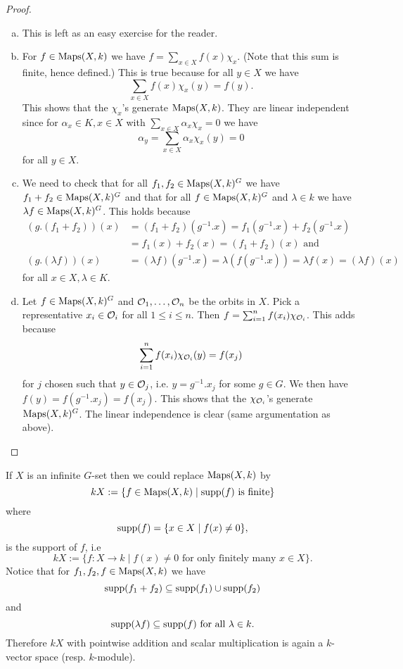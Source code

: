 \begin{proof}
 \begin{enumerate}[a)]
  \item
   This is left as an easy exercise for the reader.
  \item
   For $f \in \operatorname{Maps}(X,k)$ we have $f = \sum_{x \in X} f(x) \chi_x$. (Note that this sum is finite, hence defined.) This is true because for all $y \in X$ we have
   \[
    \sum_{x \in X} f(x) \chi_x(y) = f(y).
   \]
   This shows that the $\chi_x$'s generate $\operatorname{Maps}(X,k)$. They are linear independent since for $\alpha_x \in K, x \in X$ with $\sum_{x \in X} \alpha_x \chi_x = 0$ we have
   \[
    \alpha_y = \sum_{x \in X} \alpha_x \chi_x(y) = 0
   \]
   for all $y \in X$.
  \item
   We need to check that for all $f_1, f_2 \in \operatorname{Maps}(X,k)^G$ we have $f_1+f_2 \in \operatorname{Maps}(X,k)^G$ and that for all $f \in \operatorname{Maps}(X,k)^G$ and $\lambda \in k$ we have $\lambda f \in \operatorname{Maps}(X,k)^G$. This holds because
   \begin{align*}
    (g.(f_1+f_2))(x)
    &= (f_1+f_2)(g^{-1}.x) = f_1(g^{-1}.x) + f_2(g^{-1}.x) \\
    &= f_1(x) + f_2(x) = (f_1+f_2)(x) \text{ and} \\
    (g.(\lambda f))(x)
    &= (\lambda f)(g^{-1}.x) = \lambda (f(g^{-1}.x)) = \lambda f(x) = (\lambda f)(x)
   \end{align*}
   for all $x \in X, \lambda \in K$.
  \item
   Let $f \in \operatorname{Maps}(X,k)^G$ and $\mathcal{O}_1, \ldots, \mathcal{O}_n$ be the orbits in $X$. Pick a representative $x_i \in \mathcal{O}_i$ for all $1 \leq i \leq n$. Then $f = \sum_{i=1}^n f(x_i) \chi_{\mathcal{O}_i}$. This adds because
   \[
    \sum_{i=1}^n f(x_i) \chi_{\mathcal{O}_i}(y) = f(x_j)
   \]
   for $j$ chosen such that $y \in \mathcal{O}_j$, i.e. $y = g^{-1}.x_j$ for some $g \in G$. We then have $f(y) = f(g^{-1}.x_j) = f(x_j)$. This shows that the $\chi_{\mathcal{O}_i}$’s generate $\operatorname{Maps}(X,k)^G$. The linear independence is clear (same argumentation as above).
 \end{enumerate}
\end{proof}


If $X$ is an infinite $G$-set then we could replace $\operatorname{Maps}(X,k)$ by
\[
 kX := \{f \in \operatorname{Maps}(X,k) \mid \operatorname{supp}(f) \text{ is finite}\}
\]
where
\[
 \operatorname{supp}(f) = \{x \in X \mid f(x) \neq 0\},
\]
is the support of $f$, i.e
\[
 kX := \{f : X \to k \mid f(x) \neq 0 \text{ for only finitely many } x \in X\}.
\]
Notice that for $f_1, f_2, f \in \operatorname{Maps}(X,k)$ we have
\[
 \operatorname{supp}(f_1+f_2) \subseteq \operatorname{supp}(f_1) \cup \operatorname{supp}(f_2)
\]
and
\[
 \operatorname{supp}(\lambda f) \subseteq \operatorname{supp}(f) \text{ for all } \lambda \in k.
\]
Therefore $kX$ with pointwise addition and scalar multiplication is again a $k$-vector space (resp. $k$-module).

